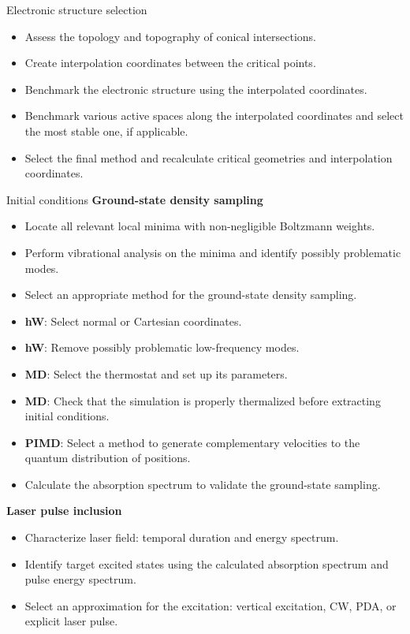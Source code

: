 \documentclass[9pt,bestpractices]{livecoms}
\begin{document}
\begin{Checklists*}[p!]
\begin{checklist}{Electronic structure selection}
\begin{itemize}
\item Assess the topology and topography of conical intersections.
\item Create interpolation coordinates between the critical points.
\item Benchmark the electronic structure using the interpolated coordinates.
\item Benchmark various active spaces along the interpolated coordinates and select the most stable one, if applicable.
\item Select the final method and recalculate critical geometries and interpolation coordinates.
\end{itemize}
\end{checklist}

\begin{checklist}{Initial conditions}
\textbf{Ground-state density sampling}
\begin{itemize}
\item Locate all relevant local minima with non-negligible Boltzmann weights. 
\item Perform vibrational analysis on the minima and identify possibly problematic modes. 
\item Select an appropriate method for the ground-state density sampling. 
\item \textbf{hW}: Select normal or Cartesian coordinates. 
\item \textbf{hW}: Remove possibly problematic low-frequency modes. 
\item \textbf{MD}: Select the thermostat and set up its parameters. 
\item \textbf{MD}: Check that the simulation is properly thermalized before extracting initial conditions.
\item \textbf{PIMD}: Select a method to generate complementary velocities to the quantum distribution of positions. 
\item Calculate the absorption spectrum to validate the ground-state sampling.
\end{itemize}

\textbf{Laser pulse inclusion} 
\begin{itemize}
    \item Characterize laser field: temporal duration and energy spectrum.
    \item Identify target excited states using the calculated absorption spectrum and pulse energy spectrum. 
    \item Select an approximation for the excitation: vertical excitation, CW, PDA, or explicit laser pulse. 
\end{itemize}
    
\end{checklist}
\end{Checklists*}
\end{document}
